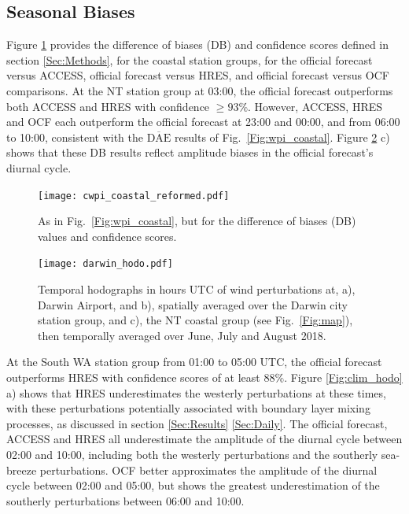 \documentclass[twocol]{ametsoc}
\begin{document}
\subsection{Seasonal Biases}
\label{Sec:Seasonal}
Figure \ref{Fig:cwpi_coastal} provides the difference of biases (DB) and confidence scores defined in section \ref{Sec:Methods}, for the coastal station groups, for the official forecast versus ACCESS, official forecast versus HRES, and official forecast versus OCF comparisons. At the NT station group at 03:00, the official forecast outperforms both ACCESS and HRES with confidence $\geq 93\%$. However, ACCESS, HRES and OCF each outperform the official forecast at 23:00 and 00:00, and from 06:00 to 10:00, consistent with the $\overline{\text{DAE}}$ results of Fig.~\ref{Fig:wpi_coastal}. Figure \ref{Fig:darwin_hodo} c) shows that these DB results reflect amplitude biases in the official forecast's diurnal cycle.

\begin{figure}
\centering
\texttt{[image: cwpi\_coastal\_reformed.pdf]}
\caption{As in Fig.~\ref{Fig:wpi_coastal}, but for the difference of biases (DB) values and confidence scores.}
\label{Fig:cwpi_coastal}
\end{figure}

\begin{figure}
\centering
\texttt{[image: darwin\_hodo.pdf]}
\caption{Temporal hodographs in hours UTC of wind perturbations at, a), Darwin Airport, and b), spatially averaged over the Darwin city station group, and c), the NT coastal group (see Fig.~\ref{Fig:map}), then temporally averaged over June, July and August 2018.}
\label{Fig:darwin_hodo}
\end{figure}

At the South WA station group from 01:00 to 05:00 UTC, the official forecast outperforms HRES with confidence scores of at least $88\%$. Figure \ref{Fig:clim_hodo} a) shows that HRES underestimates the westerly perturbations at these times, with these perturbations potentially associated with boundary layer mixing processes, as discussed in section \ref{Sec:Results} \ref{Sec:Daily}. The official forecast, ACCESS and HRES all underestimate the amplitude of the diurnal cycle between 02:00 and 10:00, including both the westerly perturbations and the southerly sea-breeze perturbations. OCF better approximates the amplitude of the diurnal cycle between 02:00 and 05:00, but shows the greatest underestimation of the southerly perturbations between 06:00 and 10:00.
\end{document}

